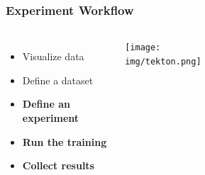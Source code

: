 \documentclass[aspectratio=169,11pt,hyperref={colorlinks=true}]{beamer}
\begin{document}
\begin{frame}
    \frametitle{Experiment Workflow}
    \begin{columns}
        \begin{itemize}
            \item{Visualize data}
            \item{Define a dataset}
            \item{\textbf{Define an experiment}}
            \item{\textbf{Run the training}}
            \item{\textbf{Collect results}}
        \end{itemize}
        \vspace{0.1\paperheight}
        \begin{center}
          \texttt{[image: img/tekton.png]}
        \end{center}
          \begin{figure}
            
          \end{figure}
          \begin{figure}
            
          \end{figure}
    \end{columns}
\end{frame}
\end{document}
